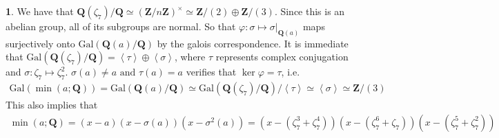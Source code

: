 \documentclass[11pt]{article}
\theoremstyle{definition}
\newtheorem{pb}{}
\newcommand{\gen}[1]{\left\langle #1 \right\rangle}
\newcommand{\tand}{\text{ and }}
\newcommand{\gal}{\text{Gal}}
\begin{document}
    \begin{pb}
        We have that \(\mathbf{Q}(\zeta_7)/\mathbf{Q} \simeq (\mathbf{Z}/n\mathbf{Z})^\times \simeq \mathbf{Z}/(2)\oplus\mathbf{Z}/(3)\). Since this is an abelian group, all of its
        subgroups are normal. So that \(\varphi:\sigma \mapsto \sigma \vert_{\mathbf{Q}(a)}\) maps surjectively onto \(\gal(\mathbf{Q}(a)/\mathbf{Q})\) by the galois correspondence.
        It is immediate that \(\gal(\mathbf{Q}(\zeta_7)/\mathbf{Q}) = \gen{\tau}\oplus\gen{\sigma}\), where \(\tau\) represents complex conjugation and \(\sigma: \zeta_7 \mapsto \zeta_7^2\). \(\sigma(a) \neq a \tand \tau(a) = a\) verifies that \(\ker \varphi = \tau\), i.e.
        \begin{align*}
            \gal(\min(a;\mathbf{Q})) = \gal (\mathbf{Q}(a)/\mathbf{Q}) \simeq \gal(\mathbf{Q}(\zeta_7)/\mathbf{Q})/\gen{\tau}
            \simeq \gen{\sigma} \simeq \mathbf{Z}/(3)
        \end{align*}
        This also implies that 
        \begin{align*}
            \min(a;\mathbf{Q}) = (x - a)(x - \sigma(a))(x - \sigma^2(a))
            = (x - (\zeta_7^3 + \zeta_7^4))(x - (\zeta_7^6 + \zeta_7))(x - (\zeta_7^5 + \zeta_7^2))
        \end{align*}
    \end{pb}
\end{document}
